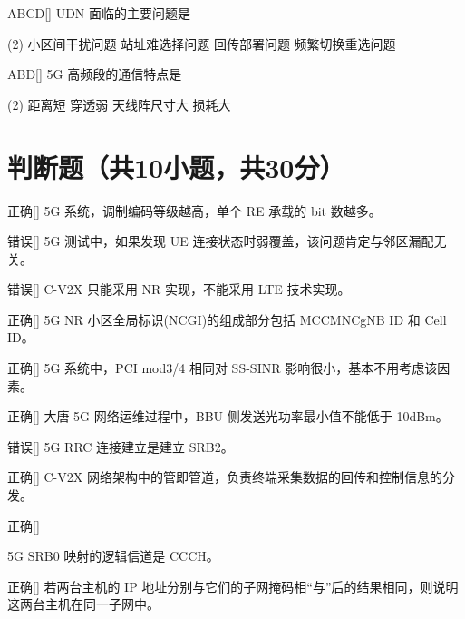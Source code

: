 \begin{choice}{\;ABCD\;}[]
    UDN 面临的主要问题是
    \begin{tasks}(2)
        \task 小区间干扰问题
        \task 站址难选择问题
        \task 回传部署问题
        \task 频繁切换重选问题
    \end{tasks}
\end{choice}

\begin{choice}{\;ABD\;}[]
    5G 高频段的通信特点是
    \begin{tasks}(2)
        \task 距离短
        \task 穿透弱
        \task 天线阵尺寸大
        \task 损耗大
    \end{tasks}
\end{choice}



\section{判断题（共10小题，共30分）}

\begin{choice}{\;正确\;}[]
    5G 系统，调制编码等级越高，单个 RE 承载的 bit 数越多。
\end{choice}


\begin{choice}{\;错误\;}[]
    5G 测试中，如果发现 UE 连接状态时弱覆盖，该问题肯定与邻区漏配无关。
\end{choice}

\begin{choice}{\;错误\;}[]
    C-V2X 只能采用 NR 实现，不能采用 LTE 技术实现。
\end{choice}

\begin{choice}{\;正确\;}[]
    5G NR 小区全局标识(NCGI)的组成部分包括 MCC\;MNC\;gNB ID 和 Cell ID。
\end{choice}

\begin{choice}{\;正确\;}[]
5G 系统中，PCI mod3/4 相同对 SS-SINR 影响很小，基本不用考虑该因素。
\end{choice}

\begin{choice}{\;正确\;}[]
    大唐 5G 网络运维过程中，BBU 侧发送光功率最小值不能低于-10dBm。

\end{choice}


\begin{choice}{\;错误\;}[]
    5G RRC 连接建立是建立 SRB2。

\end{choice}

\begin{choice}{\;正确\;}[]
    C-V2X 网络架构中的管即管道，负责终端采集数据的回传和控制信息的分发。

\end{choice}

\begin{choice}{\;正确\;}[]

    5G SRB0 映射的逻辑信道是 CCCH。
\end{choice}


\begin{choice}{\;正确\;}[]
    若两台主机的 IP 地址分别与它们的子网掩码相“与”后的结果相同，则说明这两台主机在同一子网中。

\end{choice}



